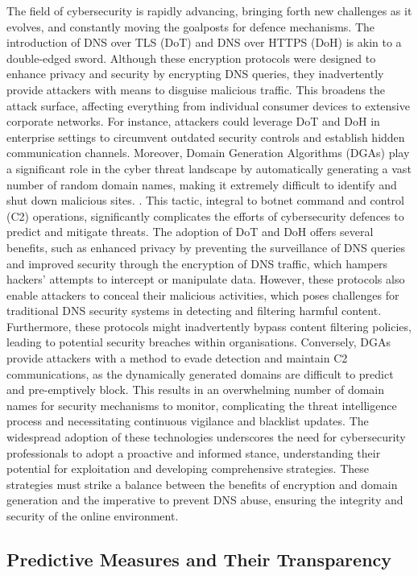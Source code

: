 The field of cybersecurity is rapidly advancing, bringing forth new challenges as it evolves, and constantly moving the goalposts for defence mechanisms. The introduction of DNS over TLS (DoT) and DNS over HTTPS (DoH) is akin to a double-edged sword. Although these encryption protocols were designed to enhance privacy and security by encrypting DNS queries, they inadvertently provide attackers with means to disguise malicious traffic. This broadens the attack surface, affecting everything from individual consumer devices to extensive corporate networks. For instance, attackers could leverage DoT and DoH in enterprise settings to circumvent outdated security controls and establish hidden communication channels. Moreover, Domain Generation Algorithms (DGAs) play a significant role in the cyber threat landscape by automatically generating a vast number of random domain names, making it extremely difficult to identify and shut down malicious sites. \cite{kaur2023artificial}. This tactic, integral to botnet command and control (C2) operations, significantly complicates the efforts of cybersecurity defences to predict and mitigate threats.
The adoption of DoT and DoH offers several benefits, such as enhanced privacy by preventing the surveillance of DNS queries and improved security through the encryption of DNS traffic, which hampers hackers' attempts to intercept or manipulate data. However, these protocols also enable attackers to conceal their malicious activities, which poses challenges for traditional DNS security systems in detecting and filtering harmful content. Furthermore, these protocols might inadvertently bypass content filtering policies, leading to potential security breaches within organisations.
Conversely, DGAs provide attackers with a method to evade detection and maintain C2 communications, as the dynamically generated domains are difficult to predict and pre-emptively block. This results in an overwhelming number of domain names for security mechanisms to monitor, complicating the threat intelligence process and necessitating continuous vigilance and blacklist updates. The widespread adoption of these technologies underscores the need for cybersecurity professionals to adopt a proactive and informed stance, understanding their potential for exploitation and developing comprehensive strategies. These strategies must strike a balance between the benefits of encryption and domain generation and the imperative to prevent DNS abuse, ensuring the integrity and security of the online environment.


\subsection{Predictive Measures and Their Transparency}

